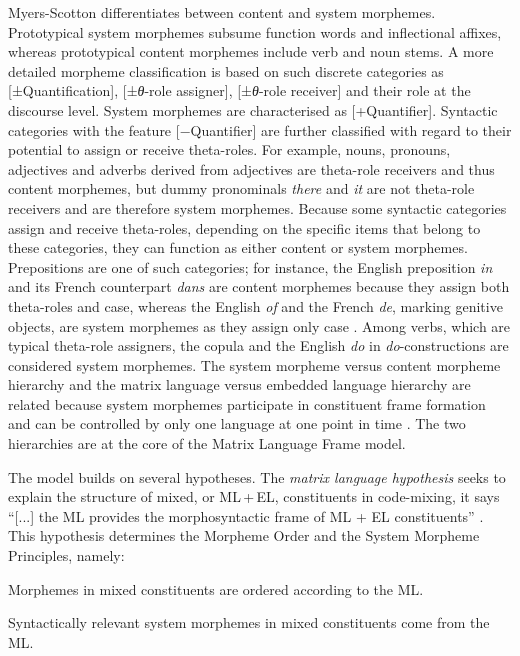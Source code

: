 Myers-Scotton differentiates between content and system morphemes. Prototypical system morphemes subsume function words and inflectional affixes, whereas prototypical content morphemes include verb and noun stems. A more detailed morpheme classification is based on such discrete categories as [±Quantification], [±\textit{θ}-role assigner], [±\textit{θ}-role receiver] and their role at the discourse level. System morphemes are characterised as [+Quantifier]. Syntactic categories with the feature [−Quantifier] are further classified with regard to their potential to assign or receive theta-roles. For example, nouns, pronouns, adjectives and adverbs derived from adjectives are theta-role receivers and thus content morphemes, but dummy pronominals \textit{there} and \textit{it} are not theta-role receivers and are therefore system morphemes. Because some syntactic categories assign and receive theta-roles, depending on the specific items that belong to these categories, they can function as either content or system morphemes. Prepositions are one of such categories; for instance, the English preposition \textit{in} and its French counterpart \textit{dans} are content morphemes because they assign both theta-roles and case, whereas the English \textit{of} and the French \textit{de}, marking genitive objects, are system morphemes as they assign only case \citep[cf.][98--102]{myers-scotton-duelling-1993}. Among verbs, which are typical theta-role assigners, the copula and the English \textit{do} in \textit{do}-constructions are considered system morphemes. The system morpheme versus content morpheme hierarchy and the matrix language versus embedded language hierarchy are related because system morphemes participate in constituent frame formation and can be controlled by only one language at one point in time \citep[235]{milroy-lexically-1995}. The two hierarchies are at the core of the Matrix Language Frame model.

The model builds on several hypotheses. The \textit{matrix language hypothesis} seeks to explain the structure of mixed, or ML\,+\,EL,  constituents in code-mixing, it says ``[...] the ML provides the morphosyntactic frame of ML + EL constituents'' \citep[82]{myers-scotton-duelling-1993}. This hypothesis determines the Morpheme Order and the System Morpheme Principles, namely:

\begin{description}\sloppy
\item [The Morpheme Order Principle:] Morphemes in mixed constituents are ordered according to the ML. 
\item [The System Morpheme Principle:] Syntactically relevant system morphemes in mixed constituents come from the ML. \citep[cf.][239]{milroy-lexically-1995} 
\end{description}

